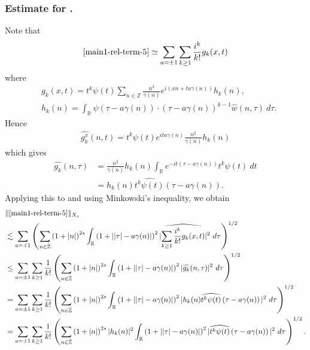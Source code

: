 \documentclass[12pt,reqno]{amsart}
\numberwithin{equation}{section}  %
\renewcommand{\cref}{\Cref}
\newcommand{\rr}{\mathbb{R}}
\newcommand{\zz}{\mathbb{Z}}
\newcommand{\zzdot}{\dot{\zz}}
\newcommand{\wh}{\widehat}
\begin{document}
\subsubsection{Estimate for \cref{main1-rel-term-5}.}
Note that
%
%
\begin{equation}
	\label{1n}
	\begin{split}
    \cref{main1-rel-term-5} \simeq \sum_{a = \pm 1}\sum_{k \ge 1}
		\frac{i^k}{k!}g_k(x,t)
	\end{split}
\end{equation}
%
%
where 
%
%
\begin{equation*}
	\begin{split}
	  & g_k(x,t) = t^k \psi(t) \sum_{n \in \zz} \frac{n^{2}}{\gamma(n)} e^{i\left( xn + ta \gamma(n)
		\right)} h_k(n),
		\\
		& h_k(n) = \int_\rr \psi \left( \tau - a\gamma(n) \right) \cdot \left(
		\tau - a\gamma(n) \right)^{k -1} \wh{w}(n, \tau) \ d \tau.
	\end{split}
\end{equation*}
%
%
Hence
%
%
\begin{equation*}
	\begin{split}
		\wh{g_k^x}(n, t) = t^{k} \psi(t) e^{i t a\gamma(n)} \frac{n^{2}}{\gamma(n)}h_k(n)
	\end{split}
\end{equation*}
%
%
which gives
%
%
\begin{equation*}
	\begin{split}
		\wh{g_k}(n, \tau)
		& = \frac{n^{2}}{\gamma(n)}h_k(n) \int_\rr e^{-it\left( \tau - a\gamma(n) \right)}
		t^{k}\psi(t) \ dt
		\\
		& = h_k(n) \wh{t^{k}\psi(t)} \left( \tau - a\gamma(n) \right).
	\end{split}
\end{equation*}
%
%
Applying this to \cref{1n} and using Minkowski's inequality, we obtain
%
%
\begin{equation}
	\label{2n}
	\begin{split}
		& \|\cref{main1-rel-term-5}\|_{X_{s}} 
    \\
    & \lesssim \sum_{a = \pm 1} \left( \sum_{n \in \zzdot} \left (1 + |n| \right )^{2s}
    \int_\rr \left( 1 + | |\tau| - a\gamma(n) | \right)^{2}
    | \wh{\sum_{k \ge 1} \frac{i^k}{k!}g_k(x,t)} |^2 \ d \tau
		\right)^{1/2}
		\\
		& \le \sum_{a = \pm 1}\sum_{k \ge 1} \frac{1}{k!}\left( \sum_{n \in \zzdot} \left (1 + |n| \right )^{2s}
    \int_\rr \left( 1 + | |\tau| - a\gamma(n) | \right)^{2} | \wh{g_k}(n, \tau) |^2 \
		d \tau \right)^{1/2}
		\\
		& = \sum_{a = \pm 1}\sum_{k \ge 1} \frac{1}{k!} \left( \sum_{n \in \zzdot} \left (1 + |n| \right )^{2s}
    \int_\rr \left( 1 + | |\tau| - a\gamma(n) | \right)^{2} | h_k(n) \wh{t^k
		\psi(t)} \left( \tau - a\gamma(n) \right) |^2 \ d \tau \right)^{1/2}
		\\
		& = \sum_{a = \pm 1}\sum_{k \ge 1} \frac{1}{k!} \left( \sum_{n \in \zzdot} \left (1 + |n| \right )^{2s} |
    h_k(n) |^2 \int_\rr \left( 1 + | |\tau| - a\gamma(n) | \right)^{2} | \wh{t^k
		\psi(t)} \left( \tau - a\gamma(n) \right) |^2 \ d \tau \right)^{1/2}.
	\end{split}
\end{equation}
\end{document}
